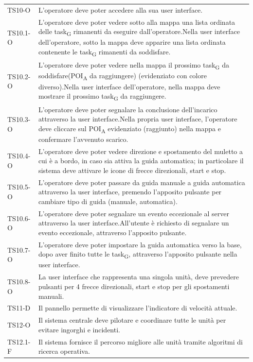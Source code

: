 \begin{longtable}{ >{\centering}p{} >{}p{}}
	TS10-O & L'operatore deve poter accedere alla sua user interface.\tabularnewline
	
	TS10.1-O & L'operatore deve poter vedere sotto alla mappa una lista ordinata delle task\textsubscript{G} rimanenti da eseguire dall'operatore.\newline Nella user interface dell'operatore, sotto la mappa deve apparire una lista ordinata contenente le task\textsubscript{G} rimanenti da soddisfare.\tabularnewline
	TS10.2-O & L'operatore deve poter vedere nella mappa il prossimo task\textsubscript{G} da soddisfare(POI\textsubscript{A} da raggiungere) (evidenziato con colore diverso).\newline Nella user interface dell'operatore, nella mappa deve mostrare il prossimo task\textsubscript{G} da raggiungere.\tabularnewline
	TS10.3-O & L'operatore deve poter segnalare la conclusione dell'incarico attraverso la user interface.\newline Nella propria user interface, l'operatore deve cliccare sul POI\textsubscript{A} evidenziato (raggiunto) nella mappa e confermare l'avvenuto scarico.\tabularnewline
	TS10.4-O & L'operatore deve poter vedere direzione e spostamento del muletto a cui è a bordo, in caso sia attiva la guida automatica; in particolare il sistema deve attivare le icone di frecce direzionali, start e stop. \tabularnewline
	TS10.5-O & L'operatore deve poter passare da guida manuale a guida automatica attraverso la user interface, premendo l'apposito pulsante per cambiare tipo di guida (manuale, automatica).\tabularnewline
	TS10.6-O & L'operatore deve poter segnalare un evento eccezionale al server attraverso la user interface.\newline All'utente è richiesto di segnalare un evento eccezionale, attraverso l'apposito pulsante.\tabularnewline
	TS10.7-O & L'operatore deve poter impostare la guida automatica verso la base, dopo aver finito tutte le task\textsubscript{G}, attraverso l'apposito pulsante nella user interface.\tabularnewline
	TS10.8-O & La user interface che rappresenta una singola unità, deve prevedere pulsanti per 4 frecce direzionali, start e stop per gli spostamenti manuali.\tabularnewline
	
	TS11-D & Il pannello permette di visualizzare l'indicatore di velocità attuale.\tabularnewline
	
	TS12-O & Il sistema centrale deve pilotare e coordinare tutte le unità per evitare ingorghi e incidenti.\tabularnewline
	TS12.1-F & Il sistema fornisce il percorso migliore alle unità tramite algoritmi di ricerca operativa.\tabularnewline
	

\end{longtable}
